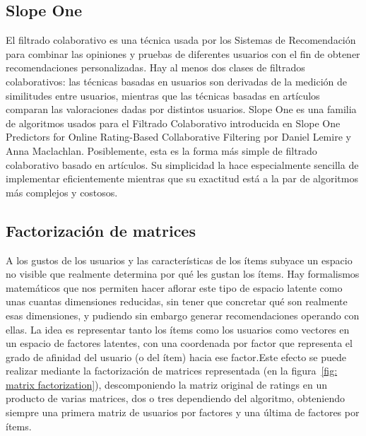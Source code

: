  	\subsection{Slope One}
	El filtrado colaborativo es una técnica usada por los Sistemas de Recomendación para combinar las opiniones y pruebas de diferentes usuarios con el fin de obtener recomendaciones personalizadas. Hay al menos dos clases de filtrados colaborativos: las técnicas basadas en usuarios son derivadas de la medición de similitudes entre usuarios, mientras que las técnicas basadas en artículos comparan las valoraciones dadas por distintos usuarios. Slope One es una familia de algoritmos usados para el Filtrado Colaborativo introducida en Slope One Predictors for Online Rating-Based Collaborative Filtering por Daniel Lemire y Anna Maclachlan. Posiblemente, esta es la forma más simple de filtrado colaborativo basado en artículos. Su simplicidad la hace especialmente sencilla de implementar eficientemente mientras que su exactitud está a la par de algoritmos más complejos y costosos.\cite{42}
 	
 	\subsection{Factorización de matrices}
 		A los gustos de los usuarios y las características de los ítems subyace un espacio no visible que realmente determina por qué les gustan los ítems. Hay formalismos matemáticos que nos permiten hacer aflorar este tipo de espacio latente como unas cuantas dimensiones reducidas, sin tener que concretar qué son realmente esas dimensiones, y pudiendo sin embargo generar recomendaciones operando con ellas. La idea es representar tanto los ítems como los usuarios como vectores en un espacio de factores latentes, con una coordenada por factor que representa el grado de afinidad del usuario (o del ítem) hacia ese factor.Este efecto se puede realizar mediante la factorización de matrices representada (en la figura~\ref{fig: matrix factorization}), descomponiendo la matriz original de ratings en un producto de varias matrices, dos o tres dependiendo del algoritmo, obteniendo siempre una primera matriz de usuarios por factores y una última de factores por ítems.\cite{43}

